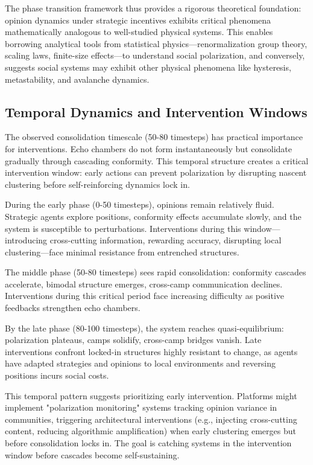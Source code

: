 \documentclass[11pt,a4paper]{article}
\begin{document}
The phase transition framework thus provides a rigorous theoretical foundation: opinion dynamics under strategic incentives exhibits critical phenomena mathematically analogous to well-studied physical systems. This enables borrowing analytical tools from statistical physics—renormalization group theory, scaling laws, finite-size effects—to understand social polarization, and conversely, suggests social systems may exhibit other physical phenomena like hysteresis, metastability, and avalanche dynamics.

\subsection{Temporal Dynamics and Intervention Windows}

The observed consolidation timescale (50-80 timesteps) has practical importance for interventions. Echo chambers do not form instantaneously but consolidate gradually through cascading conformity. This temporal structure creates a critical intervention window: early actions can prevent polarization by disrupting nascent clustering before self-reinforcing dynamics lock in.

During the early phase (0-50 timesteps), opinions remain relatively fluid. Strategic agents explore positions, conformity effects accumulate slowly, and the system is susceptible to perturbations. Interventions during this window—introducing cross-cutting information, rewarding accuracy, disrupting local clustering—face minimal resistance from entrenched structures.

The middle phase (50-80 timesteps) sees rapid consolidation: conformity cascades accelerate, bimodal structure emerges, cross-camp communication declines. Interventions during this critical period face increasing difficulty as positive feedbacks strengthen echo chambers.

By the late phase (80-100 timesteps), the system reaches quasi-equilibrium: polarization plateaus, camps solidify, cross-camp bridges vanish. Late interventions confront locked-in structures highly resistant to change, as agents have adapted strategies and opinions to local environments and reversing positions incurs social costs.

This temporal pattern suggests prioritizing early intervention. Platforms might implement "polarization monitoring" systems tracking opinion variance in communities, triggering architectural interventions (e.g., injecting cross-cutting content, reducing algorithmic amplification) when early clustering emerges but before consolidation locks in. The goal is catching systems in the intervention window before cascades become self-sustaining.
\end{document}
